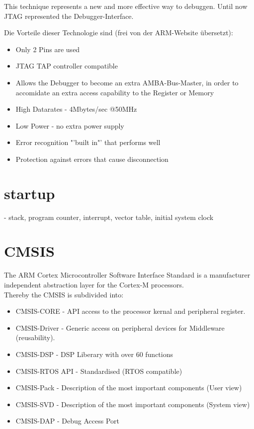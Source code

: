 This technique represents a new and more effective way to debuggen. Until now JTAG 
represented the Debugger-Interface.  

Die Vorteile dieser Technologie sind (frei von der ARM-Website \"ubersetzt):

\begin{itemize}
\item Only 2 Pins are used
\item JTAG TAP controller compatible
\item Allows the Debugger to become an extra AMBA-Bus-Master, in order to accomidate an extra 
access capability to the Register or Memory
\item High Datarates - 4Mbytes/sec @50MHz
\item Low Power - no extra power supply 
\item Error recognition "'built in"' that performs well
\item Protection against errors that cause disconnection
\end{itemize}  

\section{startup}
 - stack, program counter, interrupt, vector table, initial system clock

\section{CMSIS}
The ARM Cortex Microcontroller Software Interface Standard is a manufacturer independent 
abstraction layer for the Cortex-M processors.\\
Thereby the CMSIS is subdivided into:
\begin{itemize}
\item CMSIS-CORE - API access to the processor kernal and peripheral register.
\item CMSIS-Driver - Generic access on peripheral devices for Middleware
			(reusability).
\item CMSIS-DSP - DSP Liberary with over 60 functions
\item CMSIS-RTOS API - Standardised (RTOS compatible)
\item CMSIS-Pack - Description of the most important components (User view)
\item CMSIS-SVD - Description of the most important components (System view)
\item CMSIS-DAP - Debug Access Port
\end{itemize}

